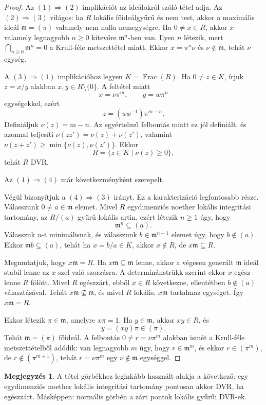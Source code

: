 \documentclass[11pt,a4paper]{article}
\theoremstyle{definition}
\newtheorem{megjegyzes}[tetel]{Megjegyzés}
\DeclareMathOperator{\Frac}{Frac}
\newcommand{\mm}{\mathfrak m}
\begin{document}
\begin{proof}
Az $(1)\Rightarrow(2)$ implikációt az ideálokról szóló tétel adja.
Az $(2)\Rightarrow(3)$ világos: ha $R$ lokális főideálgyűrű és nem
test, akkor a maximális ideál $\mm=(\pi)$ valamely nem nulla
nemegységre. Ha $0\neq x\in R$, akkor $x$ valamely legnagyobb
$n\geq 0$ kitevőre $\mm^n$-ben van. Ilyen $n$ létezik, mert
$\bigcap_{n\geq 0}\mm^n=0$ a Krull-féle metszettétel miatt. Ekkor
$x=\pi^n \nu$ és $\nu\notin\mm$, tehát $\nu$ egység.

A $(3)\Rightarrow(1)$ implikációhoz legyen $K=\Frac(R)$. Ha
$0\neq z\in K$, írjuk $z=x/y$ alakban $x,y\in R\setminus\{0\}$. A
feltétel miatt
\[
  x=\nu\pi^m,\qquad y=w\pi^n
\]
egységekkel, ezért
\[
  z=(uw^{-1})\pi^{m-n}.
\]
Definiáljuk $
\nu(z)=m-n$. Az egyértelmű felbontás miatt ez jól
definiált, és azonnal teljesíti
$
\nu(zz')=
\nu(z)+
\nu(z')$, valamint
$
\nu(z+z')\geq\min\{
\nu(z),
\nu(z')\}$. Ekkor
\[
  R=\{z\in K\mid 
\nu(z)\geq 0\},
\]
tehát $R$ DVR.

Az $(1)\Rightarrow(4)$ már következményként szerepelt.

Végül bizonyítjuk a $(4)\Rightarrow(3)$ irányt. Ez a karakterizáció
legfontosabb része. Válasszunk $0\neq a\in\mm$ elemet. Mivel
$R$ egydimenziós noether lokális integritási tartomány, az $R/(a)$ gyűrű
lokális artin, ezért létezik $n\geq 1$ úgy, hogy
\[
  \mm^n\subseteq (a).
\]
Válasszuk $n$-t minimálisnak, és válasszunk
$b\in\mm^{n-1}$ elemet úgy, hogy $b\notin(a)$. Ekkor
$\mm b\subseteq(a)$, tehát ha $x=b/a\in K$, akkor $x\notin R$, de
$x\mm\subseteq R$.

Megmutatjuk, hogy $x\mm=R$. Ha $x\mm\subseteq\mm$ lenne, akkor a
végesen generált $\mm$ ideál stabil lenne az $x$-szel való szorzásra.
A determinánstrükk szerint ekkor $x$ egész lenne $R$ fölött.
Mivel $R$ egészzárt, ebből $x\in R$ következne, ellentétben
$b\notin(a)$ választásával. Tehát $x\mm\nsubseteq\mm$, és mivel $R$
lokális, $x\mm$ tartalmaz egységet. Így $x\mm=R$.

Ekkor létezik $\pi\in\mm$, amelyre $x\pi=1$. Ha $y\in\mm$, akkor
$xy\in R$, és
\[
  y=(xy)\pi\in(\pi).
\]
Tehát $\mm=(\pi)$ főideál. A felbontás
$0\neq r=\nu\pi^m$ alakban ismét a Krull-féle metszettételből adódik:
van legnagyobb $m$ úgy, hogy $r\in\mm^m$, és ekkor
$r\in(\pi^m)$, de $r\notin(\pi^{m+1})$, tehát $r=\nu\pi^m$ egy
$\nu\notin\mm$ egységgel.
\end{proof}

\begin{megjegyzes}
A tétel görbékhez leginkább használt alakja a következő: egy
egydimenziós noether lokális integritási tartomány pontosan akkor DVR, ha
egészzárt. Másképpen: normális görbén a zárt pontok lokális
gyűrűi DVR-ek.
\end{megjegyzes}
\end{document}
